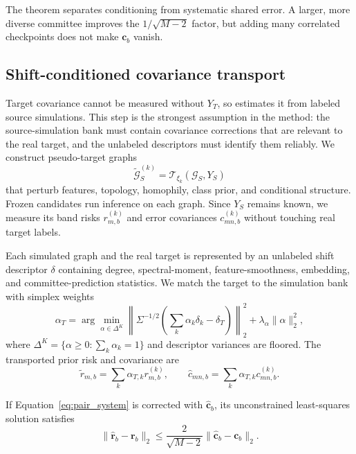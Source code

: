 The theorem separates conditioning from systematic shared error. A larger,
more diverse committee improves the $1/\sqrt{M-2}$ factor, but adding many
correlated checkpoints does not make $\mathbf c_b$ vanish.

\subsection{Shift-conditioned covariance transport}

Target covariance cannot be measured without $Y_T$, so \method estimates it
from labeled source simulations. This step is the strongest assumption in the
method: the source-simulation bank must contain covariance corrections that
are relevant to the real target, and the unlabeled descriptors must identify
them reliably. We construct pseudo-target graphs
\begin{equation}
  \widetilde{\mathcal G}_S^{(k)}
  =\mathcal T_{\xi_k}(\mathcal G_S,Y_S)
\end{equation}
that perturb features, topology, homophily, class prior, and conditional
structure. Frozen candidates run inference on each graph. Since $Y_S$ remains
known, we measure its band risks $r_{m,b}^{(k)}$ and error covariances
$c_{mn,b}^{(k)}$ without touching real target labels.

Each simulated graph and the real target is represented by an unlabeled shift
descriptor $\delta$ containing degree, spectral-moment, feature-smoothness,
embedding, and committee-prediction statistics. We match the target to the
simulation bank with simplex weights
\begin{equation}
  \alpha_T=\arg\min_{\alpha\in\Delta^K}
  \left\lVert\Sigma^{-1/2}
  \left(\sum_k\alpha_k\delta_k-\delta_T\right)\right\rVert_2^2
  +\lambda_\alpha\lVert\alpha\rVert_2^2,
  \label{eq:descriptor_match}
\end{equation}
where $\Delta^K=\{\alpha\geq0:\sum_k\alpha_k=1\}$ and descriptor variances
are floored. The transported prior risk and covariance are
\begin{equation}
  \widetilde r_{m,b}=\sum_k\alpha_{T,k}r_{m,b}^{(k)},
  \qquad
  \widehat c_{mn,b}=\sum_k\alpha_{T,k}c_{mn,b}^{(k)}.
  \label{eq:transport}
\end{equation}

\begin{corollary}
If Equation~\eqref{eq:pair_system} is corrected with
$\widehat{\mathbf c}_b$, its unconstrained least-squares solution satisfies
\begin{equation}
  \lVert\widehat{\mathbf r}_b-\mathbf r_b\rVert_2
  \leq\frac{2}{\sqrt{M-2}}
  \lVert\widehat{\mathbf c}_b-\mathbf c_b\rVert_2.
  \label{eq:transport_bound}
\end{equation}
\end{corollary}

